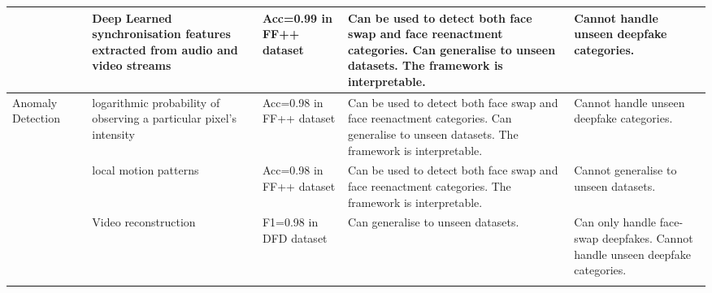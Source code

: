 \begin{table*}[htbp]
{\begin{tabular}{|p{2cm}|p{1cm}|p{5cm}|p{3cm}|p{5cm}|p{5cm}|}
                                   & \cite{zhou2021joint}                & Deep Learned synchronisation features extracted from audio and video streams                                           & Acc=0.99 in FF++ dataset \cite{rossler2019faceforensics++}                           & Can be used to detect both face swap and face reenactment categories. Can generalise to unseen datasets. The framework is interpretable.                                                                                                    & Cannot handle unseen deepfake categories.                                                             \\ \hline
\multirow{4}{*}{Anomaly Detection} & \cite{khodabakhsh2020generalizable} & logarithmic probability of observing a particular pixel's intensity                                                    & Acc=0.98 in FF++ dataset \cite{rossler2019faceforensics++}                           & Can be used to detect both face swap and face reenactment categories. Can generalise to unseen datasets. The framework is interpretable.                                                                                                    & Cannot handle unseen deepfake categories.                                                             \\ \cline{2-6} 
                                   & \cite{wang2020exposing}             & local motion patterns                                                                                                  & Acc=0.98 in FF++ dataset \cite{rossler2019faceforensics++}                           & Can be used to detect both face swap and face reenactment categories. The framework is interpretable.                                                                                                                                       & Cannot generalise to unseen datasets.                                                                 \\ \cline{2-6} 
                                   & \cite{khalid2020oc}                 & Video reconstruction                                                                                                   & F1=0.98 in DFD dataset \cite{bhat2024dfda}                             & Can generalise to unseen datasets.                                                                                                                                                                                                          & Can only handle face-swap deepfakes. Cannot handle unseen deepfake categories.                        \\ \cline{2-6} 

\end{tabular}}
\end{table*}
